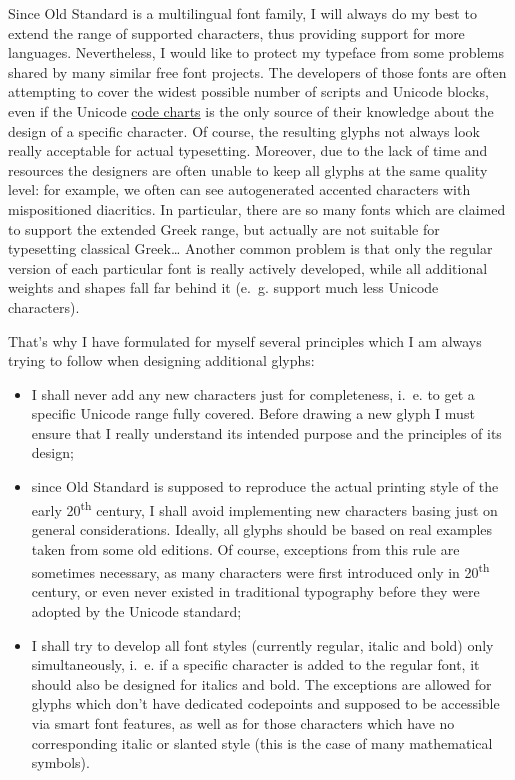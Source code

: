 \documentclass[12pt,a4paper,openany]{book}
\begin{document}
Since Old Standard is a multilingual font family, I will always do my best
to extend the range of supported characters, thus providing support for
more languages. Nevertheless, I would like to protect my typeface from some
problems shared by many similar free font projects. The developers of those
fonts are often attempting to cover the widest possible number of scripts
and Unicode blocks, even if the Unicode
\href{http://www.unicode.org/charts}{code charts} is the only source of
their knowledge about the design of a specific character. Of course, the
resulting glyphs not always look really acceptable for actual typesetting.
Moreover, due to the lack of time and resources the designers are often
unable to keep all glyphs at the same quality level: for example, we often
can see autogenerated accented characters with mispositioned diacritics. In
particular, there are so many fonts which are claimed to support the
extended Greek range, but actually are not suitable for typesetting
classical Greek\ldots{} Another common problem is that only the regular
version of each particular font is really actively developed, while all
additional weights and shapes fall far behind it (e.~g. support much less
Unicode characters).

That’s why I have formulated for myself several principles which I am
always trying to follow when designing additional glyphs:

\begin{itemize}

\item I shall never add any new characters just for completeness, i.~e. to
get a specific Unicode range fully covered. Before drawing a new glyph I
must ensure that I really understand its intended purpose and the
principles of its design;

\item since Old Standard is supposed to reproduce the actual printing style
of the early 20\textsuperscript{th} century, I shall avoid implementing new
characters basing just on general considerations. Ideally, all glyphs
should be based on real examples taken from some old editions. Of course,
exceptions from this rule are sometimes necessary, as many characters were
first introduced only in 20\textsuperscript{th} century, or even never
existed in traditional typography before they were adopted by the Unicode
standard;

\item I shall try to develop all font styles (currently regular,
italic and bold) only simultaneously, i.~e. if a specific character is added 
to the regular font, it should also be designed for italics and bold. The 
exceptions are allowed for glyphs which don't have dedicated codepoints
and supposed to be accessible via smart font features, as well as for those 
characters which have no corresponding italic or slanted style (this is the case 
of many mathematical symbols).

\end{itemize}
\end{document}
